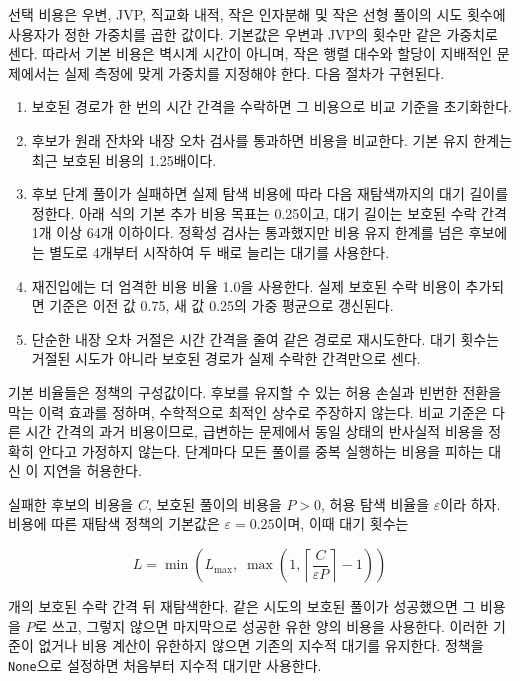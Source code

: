 \documentclass[
  10pt,
  dvipsnames]{article}
\providecommand{\tightlist}{%
  \setlength{\itemsep}{0pt}\setlength{\parskip}{0pt}}
\begin{document}
선택 비용은 우변, JVP, 직교화 내적, 작은 인자분해 및 작은 선형 풀이의
시도 횟수에 사용자가 정한 가중치를 곱한 값이다. 기본값은 우변과 JVP의
횟수만 같은 가중치로 센다. 따라서 기본 비용은 벽시계 시간이 아니며, 작은
행렬 대수와 할당이 지배적인 문제에서는 실제 측정에 맞게 가중치를
지정해야 한다. 다음 절차가 구현된다.

\begin{enumerate}
\def\labelenumi{\arabic{enumi}.}
\tightlist
\item
  보호된 경로가 한 번의 시간 간격을 수락하면 그 비용으로 비교 기준을
  초기화한다.
\item
  후보가 원래 잔차와 내장 오차 검사를 통과하면 비용을 비교한다. 기본
  유지 한계는 최근 보호된 비용의 1.25배이다.
\item
  후보 단계 풀이가 실패하면 실제 탐색 비용에 따라 다음 재탐색까지의 대기
  길이를 정한다. 아래 식의 기본 추가 비용 목표는 0.25이고, 대기 길이는
  보호된 수락 간격 1개 이상 64개 이하이다. 정확성 검사는 통과했지만 비용
  유지 한계를 넘은 후보에는 별도로 4개부터 시작하여 두 배로 늘리는
  대기를 사용한다.
\item
  재진입에는 더 엄격한 비용 비율 1.0을 사용한다. 실제 보호된 수락 비용이
  추가되면 기준은 이전 값 0.75, 새 값 0.25의 가중 평균으로 갱신된다.
\item
  단순한 내장 오차 거절은 시간 간격을 줄여 같은 경로로 재시도한다. 대기
  횟수는 거절된 시도가 아니라 보호된 경로가 실제 수락한 간격만으로 센다.
\end{enumerate}

기본 비율들은 정책의 구성값이다. 후보를 유지할 수 있는 허용 손실과
빈번한 전환을 막는 이력 효과를 정하며, 수학적으로 최적인 상수로 주장하지
않는다. 비교 기준은 다른 시간 간격의 과거 비용이므로, 급변하는 문제에서
동일 상태의 반사실적 비용을 정확히 안다고 가정하지 않는다. 단계마다 모든
풀이를 중복 실행하는 비용을 피하는 대신 이 지연을 허용한다.

실패한 후보의 비용을 \(C\), 보호된 풀이의 비용을 \(P>0\), 허용 탐색
비율을 \(\varepsilon\)이라 하자. 비용에 따른 재탐색 정책의 기본값은
\(\varepsilon=0.25\)이며, 이때 대기 횟수는

\[
 L=\min\!\left(L_{\max},\;\max\!\left(1,\left\lceil
                       \frac{C}{\varepsilon P}\right\rceil-1\right)\right)
 \tag{C19}
\]

개의 보호된 수락 간격 뒤 재탐색한다. 같은 시도의 보호된 풀이가
성공했으면 그 비용을 \(P\)로 쓰고, 그렇지 않으면 마지막으로 성공한 유한
양의 비용을 사용한다. 이러한 기준이 없거나 비용 계산이 유한하지 않으면
기존의 지수적 대기를 유지한다. 정책을 \texttt{None}으로 설정하면
처음부터 지수적 대기만 사용한다.
\end{document}

